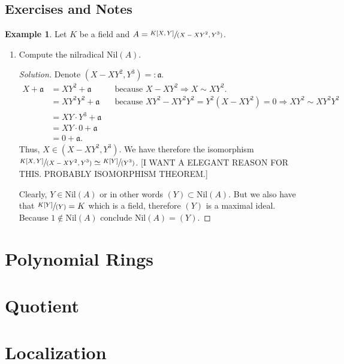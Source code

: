 \documentclass[a4paper]{book}
\theoremstyle{definition}
\newtheorem{example}{Example}[definition]
\begin{document}
\section{Exercises and Notes}

\begin{example}
    Let \(K\) be a field and \(A = \sfrac{K[X, Y]}{(X - XY^2, Y^3)}\).
    \begin{enumerate}
        \item Compute the nilradical \(\mathrm{Nil}(A)\).
        \begin{proof}[Solution]
            Denote \((X - XY^2, Y^3) =: \mathfrak{a}\).
            \begin{align*}
                X + \mathfrak{a} &= XY^2 + \mathfrak{a} && \text{because } X - XY^2 \Rightarrow X \sim XY^2 \text{.} \\
                &= XY^2 Y^2 + \mathfrak{a} && \text{because } XY^2 - XY^2Y^2 = Y^2 (X - XY^2) = 0 \Rightarrow XY^2 \sim XY^2Y^2 \\
                &= XY \cdot Y^3 + \mathfrak{a} \\
                &= XY \cdot 0 + \mathfrak{a} \\
                &= 0 + \mathfrak{a} \text{.}
            \end{align*}
            Thus, \(X \in (X - XY^2, Y^3)\). We have therefore the isomorphism \(\sfrac{K[X, Y]}{(X-XY^2, Y^3)} \simeq \sfrac{K[Y]}{(Y^3)}\). [I WANT A ELEGANT REASON FOR THIS. PROBABLY ISOMORPHISM THEOREM.]

            Clearly, \(Y \in \mathrm{Nil}(A)\) or in other words \((Y) \subset \mathrm{Nil}(A)\). But we also have that \(\sfrac{K[Y]}{(Y)} = K\) which is a field, therefore \((Y)\) is a maximal ideal. Because \(1 \not\in \mathrm{Nil}(A)\) conclude \(\mathrm{Nil}(A) = (Y)\).
        \end{proof}
    \end{enumerate}
\end{example}

\chapter{Polynomial Rings}

\chapter{Quotient}

\chapter{Localization}
\end{document}
